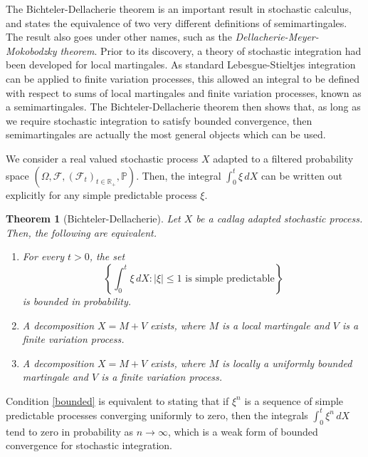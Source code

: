 \documentclass[12pt]{article}
\newtheorem*{theorem*}{Theorem}
\begin{document}

The Bichteler-Dellacherie theorem is an important result in stochastic calculus, and states the equivalence of two very different definitions of semimartingales.
The result also goes under other names, such as the \emph{Dellacherie-Meyer-Mokobodzky theorem}.
Prior to its discovery, a theory of stochastic integration had been developed for local martingales. As standard Lebesgue-Stieltjes integration can be applied to finite variation processes, this allowed an integral to be defined with respect to sums of local martingales and finite variation processes, known as a semimartingales. The Bichteler-Dellacherie theorem then shows that, as long as we require stochastic integration to satisfy bounded convergence, then semimartingales are actually the most general objects which can be used.

We consider a real valued stochastic process $X$ adapted to a filtered probability space $(\Omega,\mathcal{F},(\mathcal{F}_t)_{t\in\mathbb{R}_+},\mathbb{P})$. Then, the integral $\int_0^t\xi\,dX$ can be written out explicitly for any simple predictable process $\xi$.

\begin{theorem*}[Bichteler-Dellacherie]
Let $X$ be a cadlag adapted stochastic process. Then, the following are equivalent.
\begin{enumerate}
\item\label{bounded} For every $t>0$, the set
\begin{equation*}
\left\{\int_0^t\xi\,dX:|\xi|\le 1\textrm{ is simple predictable}\right\}
\end{equation*}
is bounded in probability.
\item\label{decomp} A decomposition $X=M+V$ exists, where $M$ is a local martingale and $V$ is a finite variation process.
\item\label{strong decomp} A decomposition $X=M+V$ exists, where $M$ is locally a uniformly bounded martingale and $V$ is a finite variation process.
\end{enumerate}
\end{theorem*}

Condition \ref{bounded} is equivalent to stating that if $\xi^n$ is a sequence of simple predictable processes converging uniformly to zero, then the integrals $\int_0^t\xi^n\,dX$ tend to zero in probability as $n\rightarrow\infty$, which is a weak form of bounded convergence for stochastic integration.
\end{document}
